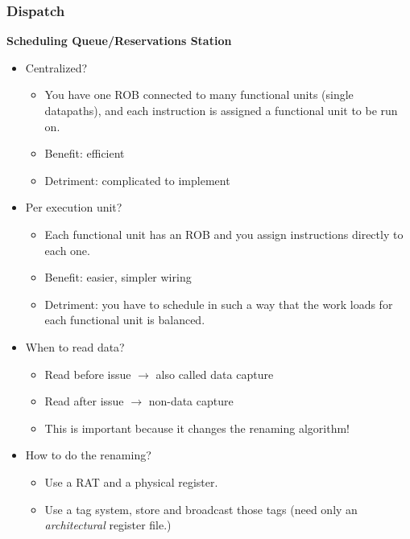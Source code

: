 \documentclass[10pt]{article}
\begin{document}
\subsubsection*{Dispatch}
\textbf{Scheduling Queue/Reservations Station}
\begin{itemize}
    \item Centralized?
    \begin{itemize}
        \item You have one ROB connected to many functional units (single datapaths), and each instruction is assigned a functional unit to be run on.
        \item Benefit: efficient
        \item Detriment: complicated to implement
    \end{itemize}
    \item Per execution unit?
    \begin{itemize}
        \item Each functional unit has an ROB and you assign instructions directly to each one.
        \item Benefit: easier, simpler wiring
        \item Detriment: you have to schedule in such a way that the work loads for each functional unit is balanced.
    \end{itemize}
    \item When to read data?
    \begin{itemize}
        \item Read before issue $\rightarrow$ also called data capture
        \item Read after issue $\rightarrow$ non-data capture
        \item This is important because it changes the renaming algorithm!
    \end{itemize}
    \item How to do the renaming?
    \begin{itemize}
        \item Use a RAT and a physical register.
        \item Use a tag system, store and broadcast those tags (need only an \textit{architectural} register file.)
    \end{itemize}
\end{itemize}
\end{document}
